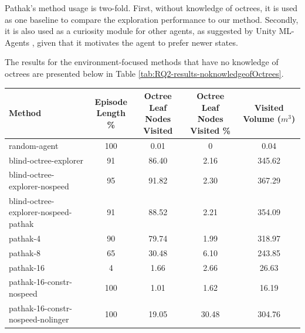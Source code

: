 Pathak's method \cite{pathak2017curiosity} usage is two-fold. First, without knowledge of octrees, it is used as one baseline to compare the exploration performance to our method. Secondly, it is also used as a curiosity module for other agents, as suggested by Unity ML-Agents \cite{github-unity-mlagents-toolkit}, given that it motivates the agent to prefer newer states.



The results for the environment-focused methods that have no knowledge of octrees are presented below in Table \ref{tab:RQ2-results-noknowledgeofOctrees}.
\begin{longtable}{|l|c|c|c|c|}                            \hline
    \textbf{Method}            
    & \theadcentered{Episode \\ Length \%}          
    & \theadcentered{Octree Leaf \\ Nodes Visited} 
    & \theadcentered{Octree Leaf \\ Nodes Visited \%} 
    & \theadcentered{Visited  \\ Volume  ($m^3$)} 

    \\ \hline
    random-agent	&	100	& 0.01 & 0	& {\cellcolor[HTML]{EBF2F0}} \color[HTML]{000000}	0.04	\\ \hline
    blind-octree-explorer & 91 & 86.40 & 2.16 & {\cellcolor[HTML]{77BAAD}} \color[HTML]{000000} 345.62 \\ \hline
    blind-octree-explorer-nospeed & 95 & 91.82 & 2.30 & {\cellcolor[HTML]{55AA99}} \color[HTML]{000000} 367.29 \\ \hline
    blind-octree-explorer-nospeed-pathak & 91 & 88.52 & 2.21 & {\cellcolor[HTML]{6AB4A5}} \color[HTML]{000000} 354.09 \\ \hline
    
    pathak-4 & 90 & 79.74 & 1.99 & {\cellcolor[HTML]{A1CFC5}} \color[HTML]{000000} 318.97 \\ \hline
    pathak-8 & {\cellcolor[HTML]{EBF2F0}} \color[HTML]{000000} 65 & 30.48 & 6.10 & {\cellcolor[HTML]{EBF2F0}} \color[HTML]{000000} 243.85 \\ \hline
    pathak-16 & {\cellcolor[HTML]{EBF2F0}} \color[HTML]{000000} 4 & 1.66 & 2.66 & {\cellcolor[HTML]{EBF2F0}} \color[HTML]{000000} 26.63 \\ \hline
    pathak-16-constr-nospeed & 100 & 1.01 & 1.62 & {\cellcolor[HTML]{EBF2F0}} \color[HTML]{000000} 16.19 \\ \hline
    pathak-16-constr-nospeed-nolinger & 100 & 19.05 & 30.48 & {\cellcolor[HTML]{B7D9D2}} \color[HTML]{000000} 304.76 \\ \hline
    

\end{longtable}
